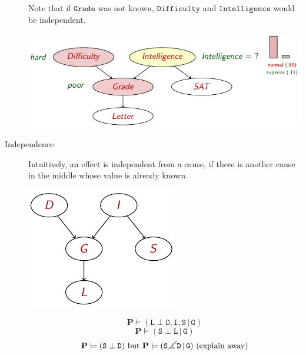 \begin{description}
\begin{descriptionlist}
\begin{example}
                    Note that if $\texttt{Grade}$ was not known, 
                    $\texttt{Difficulty}$ and $\texttt{Intelligence}$ would be independent.
                    \begin{center}
                        \includegraphics[width=0.75\linewidth]{img/_explainaway_example.pdf}
                    \end{center}
                \end{example}
        \end{descriptionlist}

    \item[Independence] 
        Intuitively, an effect is independent from a cause, 
        if there is another cause in the middle whose value is already known.
        \begin{example}
            \phantom{}

            \begin{minipage}{.3\linewidth}
                \centering
                \includegraphics[width=0.85\linewidth]{img/_independence_example.pdf}
            \end{minipage}
            \begin{minipage}{.6\linewidth}
                \[ \textbf{P} \models (\texttt{L} \perp \texttt{D}, \texttt{I}, \texttt{S} \,\vert\, \texttt{G}) \]
                \[ \textbf{P} \models (\texttt{S} \perp \texttt{L} \,\vert\, \texttt{G}) \]
                \[ \textbf{P} \models (\texttt{S} \perp \texttt{D}) \text{ but } 
                    \textbf{P} \models (\texttt{S} \,\cancel{\perp}\, \texttt{D} \,\vert\, \texttt{G}) \text{ (explain away)} \]
            \end{minipage}
        \end{example}



\end{description}
